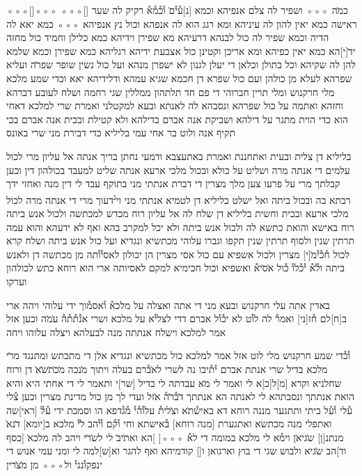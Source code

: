 \begin{aramaictext}
◦◦◦[\hspace{3em}]◦◦◦
◦◦◦[\hspace{9em}] כמ̇ה ◦◦◦ ושפיר לה צלם אנפיהא וכמא
[נ]ע֯י֯ם̇ ו֯כ֯מ֯א֯ רקיק לה שער ראישה כמא יאין להון לה עיניהא ומא רגג הוא
לה אנפהא וכול נץ
אנפיהא ◦◦◦ כמא יאא לה הדיה וכמא שפיר לה כול לבנהא דרעיהא מא
שפירן וידיהא כמא
כלילן וחמיד כול מחזה יד̇[י]הא כמא יאין כפיהא ומא אריכן וקטינן כול
אצבעת ידיהא רגליהא
כמא שפירן וכמא שלמא להן לה שקיהא וכל בתולן וכלאן די יעלן לגנון
לא ישפרן מנהא ועל כול
נשין שופר שפר̇ה ועליא שפרהא לעלא מן כולהן ועם כול שפרא דן חכמא
שגיא עמהא ודלידיהא
יאא וכדי שמע מלכא מלי חרקנוש ומלי תרין חברוהי די פם חד תלתהון
ממללין שגי רחמה ושלח
לעובע דברהא וחזהא ואתמה על כול שפרהא ונסבהא לה לאנתא ובעא
למקטלני ואמרת שרי
למלכא דאחי הוא כדי הוית מתגר על דילהא ושביקת אנה אברם בדילהא
ולא קטילת ובכית אנה
אברם בכי תקיף אנה ולוט בר אחי עמי בליליא כדי דבירת מני שרי באונס
\vacat


בליליא דן צלית ובעית ואתחננת ואמרת באתעצבא ודמעי נחתן בריך אנתה
אל עליון מרי לכול
עלמים די אנתה מרה ושליט על כולא ובכול מלכי ארעא אנתה שליט
למעבד בכולהון דין וכען
קבלתך מרי על פרעו צען מלך מצרין די דברת אנתתי מני בתוקף עבד לי
דין מנה ואחזי ידך רבתא
בה ובכול ביתה ואל ישלט בליליא דן לטמיא אנתתי מני וי\textsuperscript{נ}דעוך מרי די
אנתה מרה לכול מלכי
ארעא ובכית וחשית בליליא דן שלח לה אל עליון רוח מכדש למכתשה
ולכול אנש ביתה רוח
באישא והואת כתשא לה ולכול אנש ביתה ולא יכל למקרב בהא ואף לא
ידעהא והוא עמה
תרתין שנין ולסוף תרתין שנין תקפו וגברו עלוהי מכתשיא ונגדיא ועל כול
אנש ביתה ושלח
קרא לכול ח֯כ֯י֯מ̇[י] מצרין ולכול אשפיא עם כול אסי מצרין הן יכולון
לאסי֯ו֯תה מן מכתשה דן ולאנש
ביתה ול֯א֯ י֯כ֯לו֯ כ֯ול א̇ס̇יא֯ ואשפיא וכול חכימיא למקם לאסיותה ארי הוא
רוחא כתש לכולהון
וערקו \vacat

באדין אתה עלי חרקנוש ובעא מני די אתה ואצלה על
מלכא֯ ו֯אסמ֯וך ידי עלוהי ויהה ארי ב[ח]לם ח֯ז[ני] ואמר֯ לה לו֯ט לא יכ֯ו֯ל
אברם דדי לצלי֯א על
מלכא ושרי אנ֯ת֯ת֯ה֯ ע̇מ̇ה וכען אזל אמר למלכא וישלח אנתתה מנה לבעלהא
ויצלה עלוהו ויחה

\vacat
ו֯כ֯די שמע חרקנוש מלי לוט אזל אמר למלכא כול מכתשיא ונגדיא
אלן די מתכתש ומתנגד מר̇י מלכא בדיל שרי אנתת אברם י֯ת֯יבו נה לשרי
לא̇ב֯רם בעלה
ויתוך מ̇נכה מ̇כ̇ת̇ש̇א̇ דן ורוח שחלניא וקרא [מ]ל[כ]א לי ואמר לי מ̇א עבדתה
לי בדיל [שר]י ותאמר
לי די אחתי היא והיא הואת אנתתך ונסבתהא לי לאנתה הא אנתתך ד̇ב֯ר̇ה֯
א̇זל ועדי לך מן
כול מדינת מצרין וכען צ֯לי ע֯לי ו֯ע֯ל ביתי ותתגער מננה רוחא דא באיש֯ת̇א
וצ̇לית֯ עלו֯ה֯י֯ מ֯ג֯דפא
הו וסמכת ידי ע֯ל֯ [ראי]שה ואתפלי מנה מכתשא ואתגערת [מנה רוחא]
ב֯אישתא וחי ו֯ק֯ם ו֯י֯הב
ל̇י֯ מלכא ב[יומא] ד̇נא̇ מנתנ[ן] ש̇גיא̇ן וימ֯א לי מלכא במומה די לא֯ ◦◦◦[  
]הא ואת̇יב̇ לי
לש̇ר̇י ויהב לה מלכא̇ [כסף וד]הב ש̇גיא ולבוש שגי די בוץ וארגואן ו[\hspace{1em}]
קודמיהא ואף להגר וא[ש]למה לי ומני עמי אנוש די ינפקו֯נני֯ ול◦◦◦ מן
מ̇צ̇רין \vacat

\end{aramaictext}